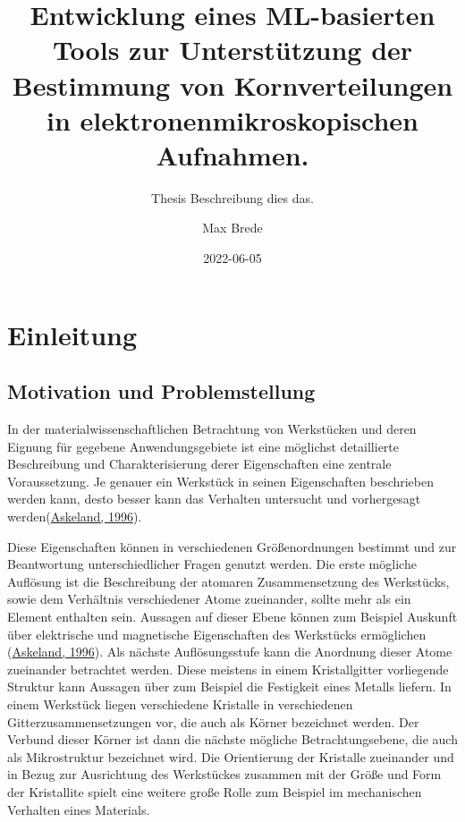 \documentclass[
  12pt,
]{book}
\title{Entwicklung eines ML-basierten Tools zur Unterstützung der Bestimmung von Kornverteilungen in elektronenmikroskopischen Aufnahmen.}
\subtitle{Thesis Beschreibung dies das.}
\author{Max Brede}
\date{2022-06-05}
\begin{document}
\maketitle

\renewcommand*\contentsname{Inhalt}
{
\setcounter{tocdepth}{1}
\tableofcontents
}
\listoffigures
\listoftables
{}
\hypertarget{einleitung}{%
\chapter{Einleitung}\label{einleitung}}

\hypertarget{motivation-und-problemstellung}{%
\section{Motivation und Problemstellung}\label{motivation-und-problemstellung}}

In der materialwissenschaftlichen Betrachtung von Werkstücken und deren Eignung für gegebene Anwendungsgebiete ist eine möglichst detaillierte Beschreibung und Charakterisierung derer Eigenschaften eine zentrale Voraussetzung. Je genauer ein Werkstück in seinen Eigenschaften beschrieben werden kann, desto besser kann das Verhalten untersucht und vorhergesagt werden(\protect\hyperlink{ref-askelandMaterialwissenschaftenGrundlagenUbungen1996}{Askeland, 1996}).

Diese Eigenschaften können in verschiedenen Größenordnungen bestimmt und zur Beantwortung unterschiedlicher Fragen genutzt werden.
Die erste mögliche Auflösung ist die Beschreibung der atomaren Zusammensetzung des Werkstücks, sowie dem Verhältnis verschiedener Atome zueinander, sollte mehr als ein Element enthalten sein. Aussagen auf dieser Ebene können zum Beispiel Auskunft über elektrische und magnetische Eigenschaften des Werkstücks ermöglichen (\protect\hyperlink{ref-askelandMaterialwissenschaftenGrundlagenUbungen1996}{Askeland, 1996}).
Als nächste Auflösungsstufe kann die Anordnung dieser Atome zueinander betrachtet werden. Diese meistens in einem Kristallgitter vorliegende Struktur kann Aussagen über zum Beispiel die Festigkeit eines Metalls liefern.
In einem Werkstück liegen verschiedene Kristalle in verschiedenen Gitterzusammensetzungen vor, die auch als Körner bezeichnet werden.
Der Verbund dieser Körner ist dann die nächste mögliche Betrachtungsebene, die auch als Mikrostruktur bezeichnet wird. Die Orientierung der Kristalle zueinander und in Bezug zur Ausrichtung des Werkstückes zusammen mit der Größe und Form der Kristallite spielt eine weitere große Rolle zum Beispiel im mechanischen Verhalten eines Materials.
\end{document}
